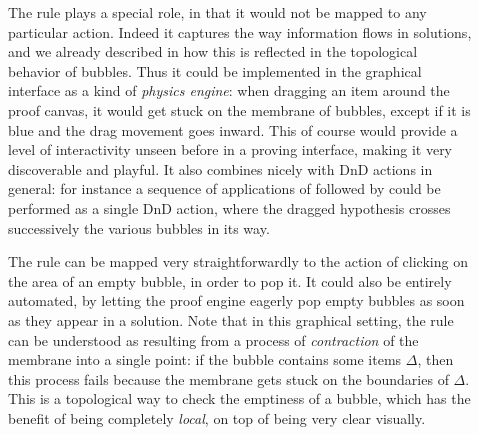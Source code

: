 %   

\begin{description}
  \item[\textbf{\flow}]
    The {} rule plays a special role, in that it would not be mapped
    to any particular action. Indeed it captures the way information flows in
    solutions, and we already described in  how this is
    reflected in the topological behavior of bubbles. Thus it could be
    implemented in the graphical interface as a kind of \emph{physics engine}:
    when dragging an item around the proof canvas, it would get stuck on the
    membrane of bubbles, except if it is blue and the drag movement goes inward.
    This of course would provide a level of interactivity unseen before in a
    proving interface, making it very discoverable and playful. It also combines
    nicely with DnD actions in general: for instance a sequence of applications
    of {} followed by {} could be performed as
    a single DnD action, where the dragged hypothesis crosses successively the
    various bubbles in its way.
  \item[\textbf{\membrane}]
    The {} rule can be mapped very straightforwardly to the action of
    clicking on the area of an empty bubble, in order to pop it. It could also
    be entirely automated, by letting the proof engine eagerly pop empty bubbles
    as soon as they appear in a solution. Note that in this graphical setting,
    the {} rule can be understood as resulting from a process of
    \emph{contraction} of the membrane into a single point: if the bubble
    contains some items $\Delta$, then this process fails because the membrane
    gets stuck on the boundaries of $\Delta$. This is a topological way to check
    the emptiness of a bubble, which has the benefit of being completely
    \emph{local}, on top of being very clear visually.
  \item[\textbf{\resource}]

\end{description}
